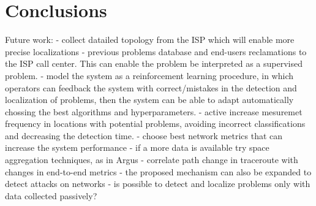 \chapter{Conclusions}


Future work:
- collect datailed topology from the ISP which will enable more precise
localizations
- previous problems database and end-users reclamations to the ISP call center.
This can enable the problem be interpreted as a supervised problem.
- model the system as a reinforcement learning procedure, in which operators
can feedback the system with correct/mistakes in the detection and localization
of problems, then the system can be able to adapt automatically chossing the
best algorithms and hyperparameters.
- active increase mesuremet frequency in locations with potential problems,
avoiding incorrect classifications and decreasing the detection time.
- choose best network metrics that can increase the system performance
- if a more data is available try space aggregation techniques, as in Argus
- correlate path change in traceroute with changes in end-to-end metrics
- the proposed mechanism can also be expanded to detect attacks on networks
- is possible to detect and localize problems only with data collected
passively?
